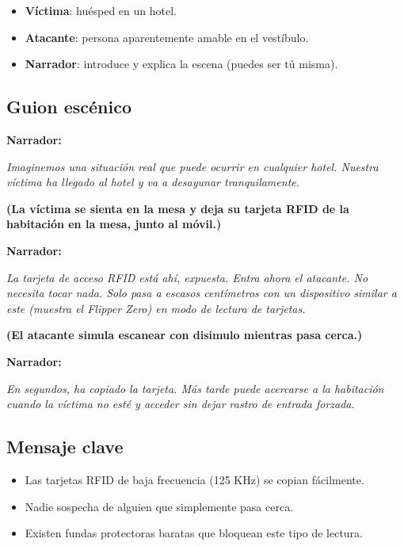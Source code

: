 \documentclass[a4paper,12pt]{article}
\begin{document}
\begin{itemize}
    \item \textbf{Víctima}: huésped en un hotel.
    \item \textbf{Atacante}: persona aparentemente amable en el vestíbulo.
    \item \textbf{Narrador}: introduce y explica la escena (puedes ser tú misma).
\end{itemize}

\subsection*{Guion escénico}

\textbf{Narrador:}

\textit{Imaginemos una situación real que puede ocurrir en cualquier hotel. Nuestra víctima ha llegado al hotel y va a desayunar tranquilamente.}

\textbf{(La víctima se sienta en la mesa y deja su tarjeta RFID de la habitación en la mesa, junto al móvil.)}

\textbf{Narrador:}

\textit{La tarjeta de acceso RFID está ahí, expuesta. Entra ahora el atacante. No necesita tocar nada. Solo pasa a escasos centímetros con un dispositivo similar a este (muestra el Flipper Zero) en modo de lectura de tarjetas.}

\textbf{(El atacante simula escanear con disimulo mientras pasa cerca.)}

\textbf{Narrador:}

\textit{En segundos, ha copiado la tarjeta. Más tarde puede acercarse a la habitación cuando la víctima no esté y acceder sin dejar rastro de entrada forzada.}

\subsection*{Mensaje clave}

\begin{itemize}
    \item Las tarjetas RFID de baja frecuencia (125 KHz) se copian fácilmente.
    \item Nadie sospecha de alguien que simplemente pasa cerca.
    \item Existen fundas protectoras baratas que bloquean este tipo de lectura.
\end{itemize}

\newpage
\end{document}
